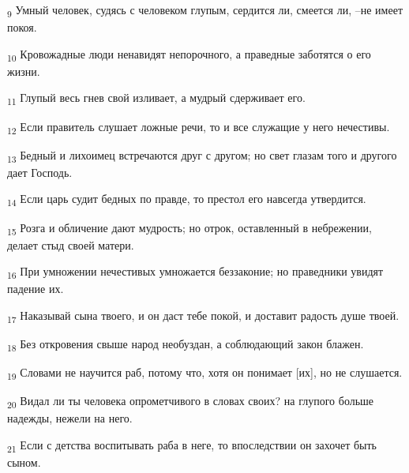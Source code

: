 \begin{tcolorbox}
\textsubscript{9} Умный человек, судясь с человеком глупым, сердится ли, смеется ли, --не имеет покоя.
\end{tcolorbox}
\begin{tcolorbox}
\textsubscript{10} Кровожадные люди ненавидят непорочного, а праведные заботятся о его жизни.
\end{tcolorbox}
\begin{tcolorbox}
\textsubscript{11} Глупый весь гнев свой изливает, а мудрый сдерживает его.
\end{tcolorbox}
\begin{tcolorbox}
\textsubscript{12} Если правитель слушает ложные речи, то и все служащие у него нечестивы.
\end{tcolorbox}
\begin{tcolorbox}
\textsubscript{13} Бедный и лихоимец встречаются друг с другом; но свет глазам того и другого дает Господь.
\end{tcolorbox}
\begin{tcolorbox}
\textsubscript{14} Если царь судит бедных по правде, то престол его навсегда утвердится.
\end{tcolorbox}
\begin{tcolorbox}
\textsubscript{15} Розга и обличение дают мудрость; но отрок, оставленный в небрежении, делает стыд своей матери.
\end{tcolorbox}
\begin{tcolorbox}
\textsubscript{16} При умножении нечестивых умножается беззаконие; но праведники увидят падение их.
\end{tcolorbox}
\begin{tcolorbox}
\textsubscript{17} Наказывай сына твоего, и он даст тебе покой, и доставит радость душе твоей.
\end{tcolorbox}
\begin{tcolorbox}
\textsubscript{18} Без откровения свыше народ необуздан, а соблюдающий закон блажен.
\end{tcolorbox}
\begin{tcolorbox}
\textsubscript{19} Словами не научится раб, потому что, хотя он понимает [их], но не слушается.
\end{tcolorbox}
\begin{tcolorbox}
\textsubscript{20} Видал ли ты человека опрометчивого в словах своих? на глупого больше надежды, нежели на него.
\end{tcolorbox}
\begin{tcolorbox}
\textsubscript{21} Если с детства воспитывать раба в неге, то впоследствии он захочет быть сыном.
\end{tcolorbox}
